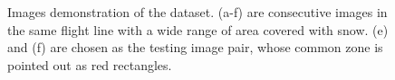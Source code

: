 \begin{figure}[htbp]
\begin{center}
{\begin{minipage}[t]{0.31\linewidth}
	\end{minipage}%
}
		\caption{Images demonstration of the dataset. (a-f) are consecutive images in the same flight line with a wide range of area covered with snow. (e) and (f) are chosen as the testing image pair, whose common zone is pointed out as red rectangles.}
		\label{SnowData}
	\end{center}
\end{figure} 

